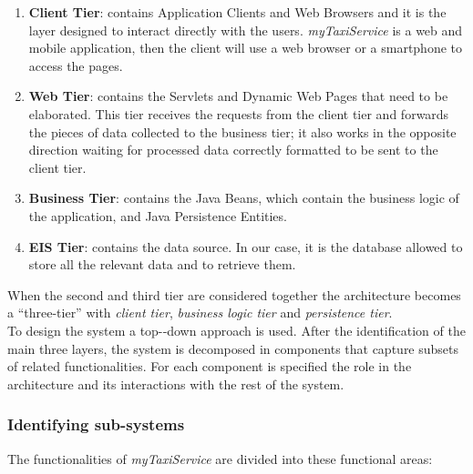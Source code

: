 \documentclass[a4paper,11pt]{report} %
\newcommand{\mts}{\mbox{\normalfont\itshape myTaxiService}}
\begin{document}
		\begin{enumerate}
			\item \textbf{Client Tier}: contains Application Clients and Web Browsers and it is the layer designed to interact directly with the users. \mts{} is a web and mobile application, then the client will use a web browser or a smartphone to access the pages.
			\item \textbf{Web Tier}: contains the Servlets and Dynamic Web Pages that need to be elaborated. This tier receives the requests from the client tier and forwards the pieces of data collected to the business tier; it also works in the opposite direction waiting for processed data correctly formatted to be sent to the client tier.
			\item \textbf{Business Tier}: contains the Java Beans, which contain the business logic of the application, and Java Persistence Entities.
			\item \textbf{EIS Tier}: contains the data source. In our case, it is the database allowed to store all the relevant data and to retrieve them.									
		\end{enumerate}
	When the second and third tier are considered together the architecture becomes a ``three-tier'' with \textit{client tier}, \textit{business logic tier} and \textit{persistence tier}.\\
	To design the system a top-­‐down approach is used. After the identification of the main three layers, the system is decomposed in components that capture subsets of related functionalities. For each component is specified the role in the architecture and its interactions with the rest of the system. 
	
	\subsubsection{Identifying sub-systems} The functionalities of \mts{} are divided into these functional areas:
	
\end{document}
